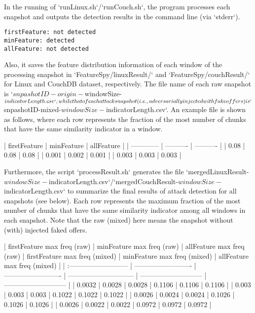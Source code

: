 In the running of `runLinux.sh`/`runCouch.sh`, the program processes each snapshot and outputs the detection results in the command line (via `stderr`).

\begin{lstlisting}[style=shell]
firstFeature: not detected
minFeature: detected
allFeature: not detected
\end{lstlisting}

Also, it saves the feature distribution information of each window of the processing snapshot in `FeatureSpy/linuxResult/` and  `FeatureSpy/couchResult/` for Linux and CouchDB dataset, respectively. The file name of each raw snapshot is `${snpashotID}-origin-${windowSize}-${indicatorLength}.csv`, while that of each attack snapshot (i.e., adversarially injected with fake offers) is `${snpashotID}-mixed-${windowSize}-${indicatorLength}.csv`. An example file is shown as follows, where each row represents the fraction of the most number of chunks that have the same similarity indicator in a window.

| firstFeature | minFeature | allFeature |
| ------------ | ---------- | ---------- |
| 0.08         | 0.08       | 0.08       |
| 0.001        | 0.002      | 0.001      |
| 0.003        | 0.003      | 0.003      |

Furthermore, the script `processResult.sh` generates the file `mergedLinuxResult-${windowSize}-${indicatorLength}.csv`/`mergedCouchResult-${windowSize}-${indicatorLength}.csv` to summarize the final results of attack detection for all snapshots (see below). Each row represents the maximum fraction of the most number of chunks that have the same similarity indicator among all windows in each snapshot. Note that the raw (mixed) here means the snapshot without (with) injected faked offers.

| firstFeature max freq (raw) | minFeature max freq (raw) | allFeature max freq (raw) | firstFeature max freq (mixed) | minFeature max freq (mixed) | allFeature max freq (mixed) |
| :-------------------------- | ------------------------- | ------------------------- | ----------------------------- | --------------------------- | --------------------------- |
| 0.0032                      | 0.0028                    | 0.0028                    | 0.1106                        | 0.1106                      | 0.1106                      |
| 0.003                       | 0.003                     | 0.003                     | 0.1022                        | 0.1022                      | 0.1022                      |
| 0.0026                      | 0.0024                    | 0.0024                    | 0.1026                        | 0.1026                      | 0.1026                      |
| 0.0026                      | 0.0022                    | 0.0022                    | 0.0972                        | 0.0972                      | 0.0972                      |


